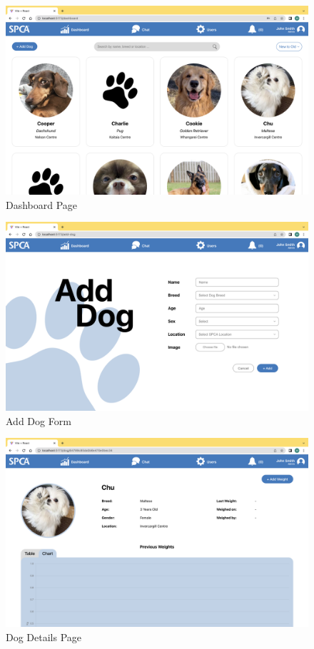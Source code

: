 \begin{figure}[h]
\centering
\includegraphics[width=\textwidth]{final-report/assets/web_dashboard.png}
\caption{Dashboard Page}
\end{figure}


\begin{figure}[h]
\centering
\includegraphics[width=\textwidth]{final-report/assets/web_add_dog.png}
\caption{Add Dog Form}
\end{figure}

\begin{figure}[h]
\centering
\includegraphics[width=\textwidth]{final-report/assets/web_dog_details.png}
\caption{Dog Details Page}
\end{figure}

